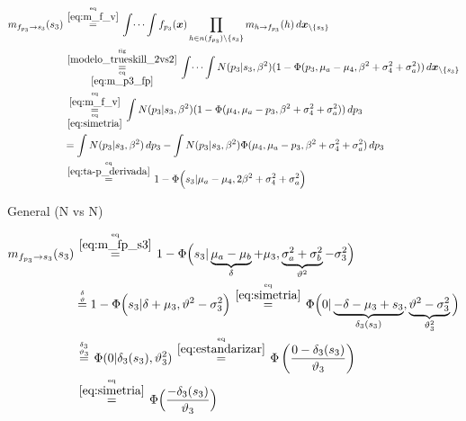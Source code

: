 \documentclass[article]{jss}
\newcommand\hfrac[2]{\genfrac{}{}{0pt}{}{#1}{#2}} %
\begin{document}
\begin{equation}\label{eq:m_fp_s3}
\begin{split}
m_{f_{p_3} \rightarrow s_3}(s_3) & \overset{\hfrac{\text{eq}}{\ref{eq:m_f_v}}}{=} \int \dots \int f_{p_3}(\bm{x}) \prod_{h \in n(f_{p_3}) \setminus \{s_3\} } m_{h \rightarrow f_{p_3}}(h) \, d\bm{x}_{\setminus \{s_3\} }  \\
&\overset{\hfrac{\text{fig}}{\ref{modelo_trueskill_2vs2}}}{\underset{\hfrac{\text{eq}}{\ref{eq:m_p3_fp}}}{=}} \int \dots \int N(p_3| s_3, \beta^2) (1 - \Phi(p_3, \mu_a  - \mu_4, \beta^2 + \sigma_4^2 + \sigma_a^2)) \, d\bm{x}_{\setminus \{s_3\} }\\
& \overset{\hfrac{\text{eq}}{\ref{eq:m_f_v}}}{\underset{\hfrac{\text{eq}}{\ref{eq:simetria}}}{=}} \int N(p_3| s_3, \beta^2) (1 - \Phi(\mu_4, \mu_a  - p_3, \beta^2 + \sigma_4^2 + \sigma_a^2)) \, dp_3 \\
&=\int N(p_3| s_3, \beta^2) \, dp_3 -  \int N(p_3| s_3, \beta^2)  \Phi(\mu_4, \mu_a  - p_3, \beta^2 + \sigma_4^2 + \sigma_a^2) \, dp_3 \\
&\overset{\hfrac{\text{eq}}{\ref{eq:ta-p_derivada}}}{=} 1 - \Phi\Big(s_3| \mu_a-  \mu_4, 2\beta^2 + \sigma_4^2 + \sigma_a^2 \Big)
\end{split}
\end{equation}

General (N vs N)

\begin{equation}
\begin{split}
m_{f_{p_3} \rightarrow s_3}(s_3) & \overset{\hfrac{\text{eq}}{\ref{eq:m_fp_s3}}}{=} 1 - \Phi\Big(s_3| \underbrace{\mu_a-\mu_b}_{\delta}+\mu_3, \underbrace{\sigma_a^2 + \sigma_b^2}_{\vartheta^2} - \sigma_3^2 \Big) \\
& \overset{\hfrac{\delta}{\vartheta}}{=} 1 - \Phi\Big(s_3| \delta +\mu_3, \vartheta^2- \sigma_3^2 \Big) \overset{\hfrac{\text{eq}}{\ref{eq:simetria}}}{=} \Phi\Big(0| \underbrace{-\delta-\mu_3+s_3}_{\delta_3(s_3)}, \underbrace{\vartheta^2- \sigma_3^2}_{\vartheta_3^2} \Big) \\
& \overset{\hfrac{\delta_3}{\vartheta_3}}{=} \Phi(0|\delta_3(s_3),\vartheta_3^2)  \overset{\hfrac{\text{eq}}{\ref{eq:estandarizar}}}{=}  \Phi\left(\frac{0-\delta_3(s_3)}{\vartheta_3}\right) \\
& \overset{\hfrac{\text{eq}}{\ref{eq:simetria}}}{=} \Phi\Big(\frac{-\delta_3(s_3)}{\vartheta_3}\Big)
\end{split}
\end{equation}
\end{document}
